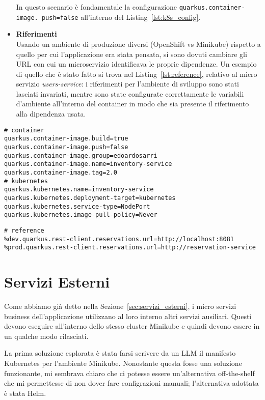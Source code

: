 \begin{itemize}
        In questo scenario è fondamentale la configurazione \texttt{quarkus.container-image. \allowbreak push=false} all'interno del Listing~\ref{lst:k8s_config}.
    \item \textbf{Riferimenti} \\
        Usando un ambiente di produzione diversi (OpenShift vs Minikube) rispetto a quello per cui l'applicazione era stata pensata, si sono dovuti cambiare gli URL con cui un microservizio identificava le proprie dipendenze. Un esempio di quello che è stato fatto si trova nel Listing~\ref{lst:reference}, relativo al micro servizio \textit{users-service}: i riferimenti per l'ambiente di sviluppo sono stati lasciati invariati, mentre sono state configurate correttamente le variabili d'ambiente all'interno del container in modo che sia presente il riferimento alla dipendenza usata.
\end{itemize}

\begin{lstlisting}[caption=Kubernetes and Docker Configuration, label=lst:k8s_config]
# container
quarkus.container-image.build=true
quarkus.container-image.push=false
quarkus.container-image.group=edoardosarri
quarkus.container-image.name=inventory-service
quarkus.container-image.tag=2.0
# kubernetes
quarkus.kubernetes.name=inventory-service
quarkus.kubernetes.deployment-target=kubernetes
quarkus.kubernetes.service-type=NodePort
quarkus.kubernetes.image-pull-policy=Never
\end{lstlisting}

\begin{lstlisting}[caption=Reference in \textit{users-service}, label=lst:reference]
# reference
%dev.quarkus.rest-client.reservations.url=http://localhost:8081
%prod.quarkus.rest-client.reservations.url=http://reservation-service
\end{lstlisting}

\section{Servizi Esterni}
Come abbiamo già detto nella Sezione~\ref{sec:servizi_esterni}, i micro servizi business dell'applicazione utilizzano al loro interno altri servizi ausiliari. Questi devono eseguire all'interno dello stesso cluster Minikube e quindi devono essere in un qualche modo rilasciati.

La prima soluzione esplorata è stata farsi scrivere da un LLM il manifesto Kubernetes per l'ambiente Minikube. Nonostante questa fosse una soluzione funzionante, mi sembrava chiaro che ci potesse essere un'alternativa off-the-shelf che mi permettesse di non dover fare configrazioni manuali; l'alternativa adottata è stata Helm.

